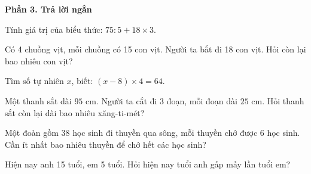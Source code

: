 \textbf{Phần 3. Trả lời ngắn}

\begin{ex} %
Tính giá trị của biểu thức: $75 : 5 + 18 \times 3$.
\end{ex}

\begin{ex} %
Có 4 chuồng vịt, mỗi chuồng có 15 con vịt. Người ta bắt đi 18 con vịt. Hỏi còn lại bao nhiêu con vịt?
\end{ex}

\begin{ex} %
Tìm số tự nhiên $x$, biết: $(x - 8) \times 4 = 64$.
\end{ex}

\begin{ex} %
Một thanh sắt dài $95\text{ cm}$. Người ta cắt đi 3 đoạn, mỗi đoạn dài $25\text{ cm}$. Hỏi thanh sắt còn lại dài bao nhiêu xăng-ti-mét?
\end{ex}

\begin{ex} %
Một đoàn gồm 38 học sinh đi thuyền qua sông, mỗi thuyền chở được 6 học sinh. Cần ít nhất bao nhiêu thuyền để chở hết các học sinh?
\end{ex}

\begin{ex} %
Hiện nay anh 15 tuổi, em 5 tuổi. Hỏi hiện nay tuổi anh gấp mấy lần tuổi em?
\end{ex}
